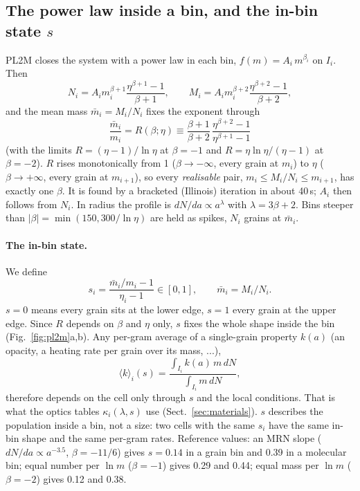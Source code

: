 \documentclass[11pt,a4paper]{article}
\begin{document}
\subsection{The power law inside a bin, and the in-bin state \texorpdfstring{$s$}{s}}\label{sec:s}
PL2M closes the system with a power law in each bin, $f(m) = A_i\,m^{\beta_i}$ on $I_i$. Then
\begin{equation}
N_i = A_i m_i^{\beta+1}\frac{\eta^{\beta+1}-1}{\beta+1},\qquad
M_i = A_i m_i^{\beta+2}\frac{\eta^{\beta+2}-1}{\beta+2},
\end{equation}
and the mean mass $\bar m_i = M_i/N_i$ fixes the exponent through
\begin{equation}\label{eq:R}
\frac{\bar m_i}{m_i} = R(\beta;\eta) \equiv \frac{\beta+1}{\beta+2}\,\frac{\eta^{\beta+2}-1}{\eta^{\beta+1}-1}
\end{equation}
(with the limits $R = (\eta-1)/\ln\eta$ at $\beta=-1$ and $R = \eta\ln\eta/(\eta-1)$ at $\beta=-2$). $R$ rises
monotonically from 1 ($\beta\to-\infty$, every grain at $m_i$) to $\eta$ ($\beta\to+\infty$, every grain at $m_{i+1}$),
so every \emph{realisable} pair, $m_i \le M_i/N_i \le m_{i+1}$, has exactly one $\beta$. It is found by a bracketed
(Illinois) iteration in about 40\,\textmu s; $A_i$ then follows from $N_i$. In radius the profile is $dN/da \propto
a^{\lambda}$ with $\lambda = 3\beta+2$. Bins steeper than $|\beta| = \min(150, 300/\ln\eta)$ are held as spikes,
$N_i$ grains at $\bar m_i$.

\paragraph{The in-bin state.} We define
\begin{equation}\label{eq:s}
s_i = \frac{\bar m_i/m_i - 1}{\eta_i - 1} \in [0,1], \qquad \bar m_i = M_i/N_i .
\end{equation}
$s = 0$ means every grain sits at the lower edge, $s = 1$ every grain at the upper edge. Since $R$ depends on $\beta$
and $\eta$ only, $s$ fixes the whole shape inside the bin (Fig.~\ref{fig:pl2m}a,b). Any per-gram average of a
single-grain property $k(a)$ (an opacity, a heating rate per grain over its mass, ...),
\begin{equation}\label{eq:kavg}
\langle k\rangle_i(s) = \frac{\int_{I_i} k(a)\,m\,dN}{\int_{I_i} m\,dN},
\end{equation}
therefore depends on the cell only through $s$ and the local conditions. That is what the optics tables
$\kappa_i(\lambda, s)$ use (Sect.~\ref{sec:materials}). $s$ describes the population inside a bin, not a size: two cells
with the same $s_i$ have the same in-bin shape and the same per-gram rates. Reference values: an MRN slope
($dN/da\propto a^{-3.5}$, $\beta = -11/6$) gives $s = 0.14$ in a grain bin and 0.39 in a molecular bin; equal number
per $\ln m$ ($\beta=-1$) gives 0.29 and 0.44; equal mass per $\ln m$ ($\beta=-2$) gives 0.12 and 0.38.
\end{document}
